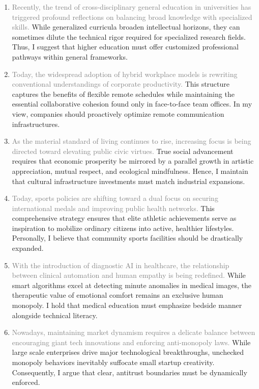 ﻿\documentclass[lang=cn,11pt]{elegantbook}
\begin{document}
\begin{enumerate}
    \item \textcolor{gray}{Recently, the trend of cross-disciplinary general education in universities has triggered profound reflections on balancing broad knowledge with specialized skills.} While generalized curricula broaden intellectual horizons, they can sometimes dilute the technical rigor required for specialized research fields. Thus, I suggest that higher education must offer customized professional pathways within general frameworks.
    \item \textcolor{gray}{Today, the widespread adoption of hybrid workplace models is rewriting conventional understandings of corporate productivity.} This structure captures the benefits of flexible remote schedules while maintaining the essential collaborative cohesion found only in face-to-face team offices. In my view, companies should proactively optimize remote communication infrastructures.
    \item \textcolor{gray}{As the material standard of living continues to rise, increasing focus is being directed toward elevating public civic virtues.} True social advancement requires that economic prosperity be mirrored by a parallel growth in artistic appreciation, mutual respect, and ecological mindfulness. Hence, I maintain that cultural infrastructure investments must match industrial expansions.
    \item \textcolor{gray}{Today, sports policies are shifting toward a dual focus on securing international medals and improving public health networks.} This comprehensive strategy ensures that elite athletic achievements serve as inspiration to mobilize ordinary citizens into active, healthier lifestyles. Personally, I believe that community sports facilities should be drastically expanded.
    \item \textcolor{gray}{With the introduction of diagnostic AI in healthcare, the relationship between clinical automation and human empathy is being redefined.} While smart algorithms excel at detecting minute anomalies in medical images, the therapeutic value of emotional comfort remains an exclusive human monopoly. I hold that medical education must emphasize bedside manner alongside technical literacy.
    \item \textcolor{gray}{Nowadays, maintaining market dynamism requires a delicate balance between encouraging giant tech innovations and enforcing anti-monopoly laws.} While large scale enterprises drive major technological breakthroughs, unchecked monopoly behaviors inevitably suffocate small startup creativity. Consequently, I argue that clear, antitrust boundaries must be dynamically enforced.

\end{enumerate}
\end{document}
